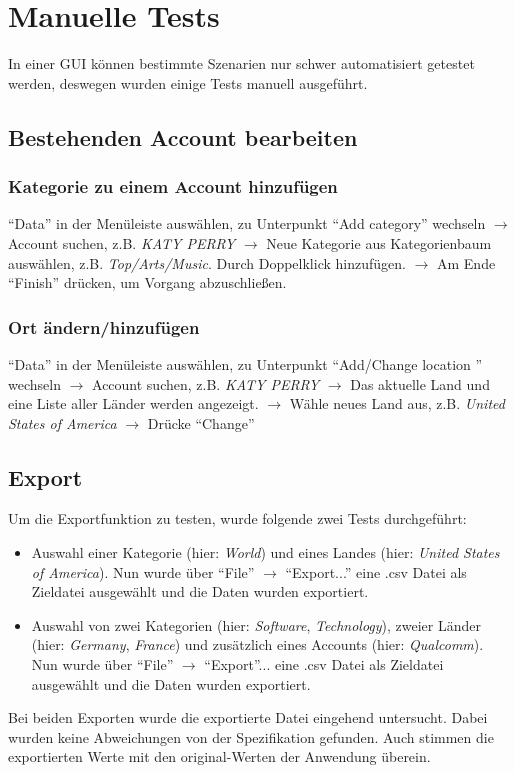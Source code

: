 \section{Manuelle Tests}
In einer GUI können bestimmte Szenarien nur schwer automatisiert getestet werden, deswegen wurden einige Tests manuell ausgeführt.
\subsection{Bestehenden Account bearbeiten}

\subsubsection{Kategorie zu einem Account hinzufügen}
"`Data"' in der Menüleiste auswählen, zu Unterpunkt "`Add category"' wechseln $\to$ Account suchen,  z.B. \textit{KATY PERRY} $\to$ Neue Kategorie aus Kategorienbaum auswählen, z.B. \textit{Top/Arts/Music}. Durch Doppelklick hinzufügen. $\to$ Am Ende "`Finish"' drücken, um Vorgang abzuschließen.

\subsubsection{Ort ändern/hinzufügen}
"`Data"' in der Menüleiste auswählen, zu Unterpunkt "`Add/Change location "' wechseln $\to$ Account suchen,  z.B. \textit{KATY PERRY} $\to$ Das aktuelle Land und eine Liste aller Länder werden angezeigt. $\to$ Wähle neues Land aus, z.B. \textit{United States of America} $\to$ Drücke "`Change"'

\subsection{Export}
Um die Exportfunktion zu testen, wurde folgende zwei Tests durchgeführt:
\begin{itemize}
\item Auswahl einer Kategorie (hier: \textit{World}) und eines Landes (hier: \textit{United States of America}). Nun wurde über "`File"' $\to$ "`Export..."' eine .csv Datei als Zieldatei ausgewählt und die Daten wurden exportiert.
\item Auswahl von zwei Kategorien (hier: \textit{Software}, \textit{Technology}), zweier Länder (hier: \textit{Germany}, \textit{France}) und zusätzlich eines Accounts (hier: \textit{Qualcomm}). Nun wurde über "`File"' $\to$ "`Export"'... eine .csv Datei als Zieldatei ausgewählt und die Daten wurden exportiert.
\end{itemize}
Bei beiden Exporten wurde die exportierte Datei eingehend untersucht. Dabei wurden keine Abweichungen von der Spezifikation gefunden. Auch stimmen die exportierten Werte mit den original-Werten der Anwendung überein.
